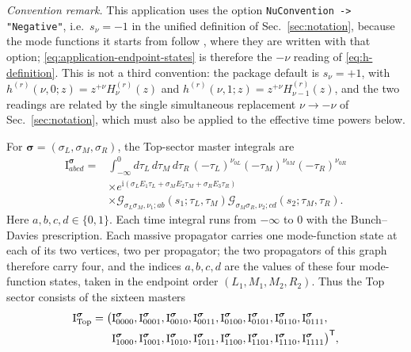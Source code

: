 \documentclass[11pt,a4paper]{article}
\newcommand{\ii}{\mathrm i}
\begin{document}
\emph{Convention remark.} This application uses the option
\texttt{NuConvention -> "Negative"}, i.e.\ $s_\nu=-1$ in the unified definition of
Sec.~\ref{sec:notation}, because the mode functions it starts from follow \cite{Chen:2024glu}, where
they are written with that option; \eqref{eq:application-endpoint-states} is therefore the $-\nu$
reading of \eqref{eq:h-definition}. This is not a third convention: the package default is
$s_\nu=+1$, with $h^{(r)}(\nu,0;z)=z^{+\nu}H^{(r)}_\nu(z)$ and
$h^{(r)}(\nu,1;z)=z^{+\nu}H^{(r)}_{\nu-1}(z)$, and the two readings are related by the single
simultaneous replacement $\nu\to-\nu$ of Sec.~\ref{sec:notation}, which must also be applied to the
effective time powers below.

For $\boldsymbol\sigma=(\sigma_L,\sigma_M,\sigma_R)$, the Top-sector master
integrals are
\begin{equation}
 \begin{aligned}
 \text{I}^{\boldsymbol\sigma}_{abcd}
 ={}&\int_{-\infty}^{0}d\tau_L\,d\tau_M\,d\tau_R\,
 (-\tau_L)^{\nu_{0L}}(-\tau_M)^{\nu_{0M}}(-\tau_R)^{\nu_{0R}}\\
 &\times e^{\ii(\sigma_LE_1\tau_L+\sigma_ME_2\tau_M+\sigma_RE_3\tau_R)}\\
 &\times\mathcal G_{\sigma_L\sigma_M,\nu_1;ab}(s_1;\tau_L,\tau_M)
 \mathcal G_{\sigma_M\sigma_R,\nu_2;cd}(s_2;\tau_M,\tau_R).
 \end{aligned}
 \label{eq:tree-indexed-masters}
\end{equation}
Here $a,b,c,d\in\{0,1\}$. Each time integral runs from $-\infty$ to $0$ with the Bunch--Davies
prescription. Each massive propagator carries one mode-function state at each of its two vertices,
two per propagator; the two propagators of this graph therefore carry four, and the indices
$a,b,c,d$ are the values of these four mode-function states, taken in the endpoint order
$(L_1,M_1,M_2,R_2)$. Thus the Top sector consists of the sixteen masters
\begin{equation}
 \begin{aligned}
 \bm{\text I}^{\boldsymbol\sigma}_{\mathrm{Top}}
 =\bigl(&\text{I}^{\boldsymbol\sigma}_{0000},
        \text{I}^{\boldsymbol\sigma}_{0001},
        \text{I}^{\boldsymbol\sigma}_{0010},
        \text{I}^{\boldsymbol\sigma}_{0011},
        \text{I}^{\boldsymbol\sigma}_{0100},
        \text{I}^{\boldsymbol\sigma}_{0101},
        \text{I}^{\boldsymbol\sigma}_{0110},
        \text{I}^{\boldsymbol\sigma}_{0111},\\
       &\text{I}^{\boldsymbol\sigma}_{1000},
        \text{I}^{\boldsymbol\sigma}_{1001},
        \text{I}^{\boldsymbol\sigma}_{1010},
        \text{I}^{\boldsymbol\sigma}_{1011},
        \text{I}^{\boldsymbol\sigma}_{1100},
        \text{I}^{\boldsymbol\sigma}_{1101},
        \text{I}^{\boldsymbol\sigma}_{1110},
        \text{I}^{\boldsymbol\sigma}_{1111}\bigr)^{\mathsf T},
 \end{aligned}
 \label{eq:tree-top-vector}
\end{equation}
\end{document}
